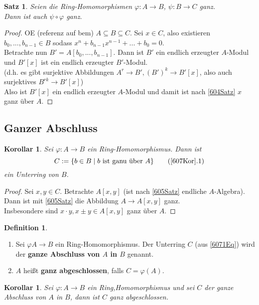 \documentclass[10pt,a4paper]{article}
\newcounter{thm}[section]
\theoremstyle{definition}
\newtheorem{definition}[thm]{Definition}
\theoremstyle{plain}
\newtheorem{kor}[thm]{Korollar}
\newtheorem{satz}[thm]{Satz}
\theoremstyle{remark}
\begin{document}
\begin{satz}\label{606Satz}
	Seien die Ring-Homomorphismen $\varphi:A\rightarrow B$, $\psi:B\rightarrow C$ ganz.\\
	Dann ist auch $\psi\circ\varphi$ ganz.
\end{satz}
\begin{proof}
	OE (referenz auf bem) $A\subseteq B\subseteq C$. Sei $x\in C$, also existieren $b_0,...,b_{n-1}\in B$ sodass $x^n+b_{n-1}x^{n-1}+...+b_0=0$.\\
	Betrachte nun $B'=A[b_0,...,b_{n-1}]$. Dann ist $B'$ ein endlich erzeugter $A$-Modul und $B'[x]$ ist ein endlich erzeugter $B'$-Modul.\\
	(d.h. es gibt surjektive Abbildungen $A^r\rightarrow B',(B')^k\rightarrow B'[x]$, also auch surjektives $B^{rk}\rightarrow B'[x]$)\\
	Also ist $B'[x]$ ein endlich erzeugter $A$-Modul und damit ist nach \ref{604Satz} $x$ ganz über $A$.
\end{proof}

\subsection{Ganzer Abschluss}
\begin{kor}\label{607Kor}
	Sei $\varphi:A\rightarrow B$ ein Ring-Homomorphismus. Dann ist
	\[C:=\{b\in B\mid\text{$b$ ist ganu über $A$}\}\label{6071Eq}\tag{\ref{607Kor}.1}\]
	ein Unterring von $B$.
\end{kor}
\begin{proof}
	Sei $x,y\in C$. Betrachte $A[x,y]$ (ist nach \ref{605Satz} endliche $A$-Algebra).\\
	Dann ist mit \ref{605Satz} die Abbildung $A\rightarrow A[x,y]$ ganz.\\
	Insbesondere sind $x\cdot y,x\pm y\in A[x,y]$ ganz über $A$.
\end{proof}

\begin{definition}
	\begin{enumerate}
		\item Sei $\varphi A\rightarrow B$ ein Ring-Homomorphismus. Der Unterring $C$ (aus \ref{6071Eq}) wird der \textbf{ganze Abschluss von $A$ in $B$} genannt.
		\item $A$ heißt \textbf{ganz abgeschlossen}, falls $C=\varphi(A)$.
	\end{enumerate}
\end{definition}

\begin{kor}
	Sei $\varphi:A\rightarrow B$ ein Ring,Homomorphismus und sei $C$ der ganze Abschluss von $A$ in $B$, dann ist $C$ ganz abgeschlossen.
\end{kor}
\end{document}
